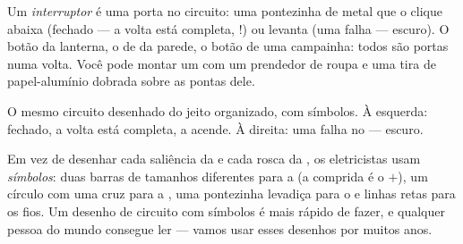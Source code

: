 \begin{example}[O interruptor]\label{ex:g3:first-electric-circuit:switch}
Um \emph{interruptor} é uma porta no circuito: uma
pontezinha de metal que o clique abaixa (fechado --- a volta está
completa, !) ou levanta (uma falha --- escuro). O botão da
lanterna, o  de  da parede, o botão de uma campainha:
todos são portas numa volta. Você pode montar um com um prendedor de
roupa e uma tira de papel-alumínio dobrada sobre as pontas dele.
\end{example}

\begin{omfigure}

{\small O mesmo circuito desenhado do jeito organizado, com símbolos.
À esquerda:  fechado, a volta está completa, a 
acende. À direita: uma falha no  --- escuro.}
\end{omfigure}

\begin{remark}\label{rem:g3:first-electric-circuit:symbols}
Em vez de desenhar cada saliência da  e cada rosca da ,
os eletricistas usam \emph{símbolos}: duas barras de tamanhos
diferentes para a  (a comprida é o $+$), um círculo com uma cruz
para a , uma pontezinha levadiça para o  e linhas
retas para os fios. Um desenho de circuito com símbolos é mais rápido
de fazer, e qualquer pessoa do mundo consegue ler --- vamos usar
esses desenhos por muitos anos.
\end{remark}

